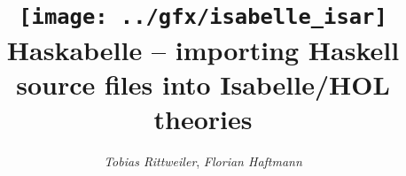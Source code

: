 \documentclass[12pt,a4paper,fleqn]{report}
\title{\texttt{[image: ../gfx/isabelle\_isar]}
  \\[4ex] Haskabelle -- importing Haskell source files into Isabelle/HOL theories}
\author{\emph{Tobias Rittweiler}, \emph{Florian Haftmann}}
\begin{document}
\maketitle

\begin{abstract}
  
\end{abstract}

\thispagestyle{empty}\clearpage

\clearfirst



\begingroup
 \small\raggedright\frenchspacing

\endgroup
\end{document}
